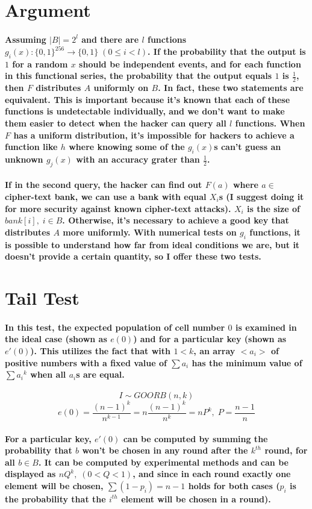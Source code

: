 \documentclass[oneside]{book}
\newcommand{\myparagraph}[1]{\paragraph{\textnormal{#1}}}
\begin{document}
\small

\section*{Argument}

\myparagraph{
Assuming $|B|=2^l$ and there are $l$ functions $g_i(x): \{0, 1\}^{256} \rightarrow \{0, 1\} \; (0 \le i < l)$. If the probability that the output is $1$ for a random $x$ should be independent events, and for each function in this functional series, the probability that the output equals $1$ is $\frac{1}{2}$, then $F$ distributes $A$ uniformly on $B$. In fact, these two statements are equivalent. This is important because it's known that each of these functions is undetectable individually, and we don't want to make them easier to detect when the hacker can query all $l$ functions. When $F$ has a uniform distribution, it's impossible for hackers to achieve a function like $h$ where knowing some of the $g_i(x)$s can't guess an unknown $g_j(x)$ with an accuracy grater than $\frac{1}{2}$.
}

\myparagraph{
If in the second query, the hacker can find out $F(a)$ where $a \in$ cipher-text bank, we can use a bank with equal $X_i$s (I suggest doing it for more security against known cipher-text attacks). $X_i$ is the size of $bank[i], \; i \in B$. Otherwise, it's necessary to achieve a good key that distributes $A$ more uniformly. With numerical tests on $g_i$ functions, it is possible to understand how far from ideal conditions we are, but it doesn't provide a certain quantity, so I offer these two tests.
}

\section{Tail Test}

\myparagraph{
In this test, the expected population of cell number $0$ is examined in the ideal case (shown as $e(0)$) and for a particular key (shown as $e'(0)$). This utilizes the fact that with $1 < k$, an array $<a_i>$ of positive numbers with a fixed value of $\sum a_i$ has the minimum value of $\sum {a_i}^k$ when all $a_i$s are equal.
}

$$I \sim GOORB(n, k)$$
$$e(0) = \frac{(n-1)^k}{n^{k-1}} = n \frac{(n-1)^k}{n^k} = n P^k, \; P = \frac{n-1}{n}$$

\myparagraph{
For a particular key, $e'(0)$ can be computed by summing the probability that $b$ won't be chosen in any round after the $k^{th}$ round, for all $b \in B$. It can be computed by experimental methods and can be displayed as $nQ^k, \; (0 < Q < 1)$, and since in each round exactly one element will be chosen, $\sum (1 - p_i) = n - 1$ holds for both cases ($p_i$ is the probability that the $i^{th}$ element will be chosen in a round).
}
\end{document}
